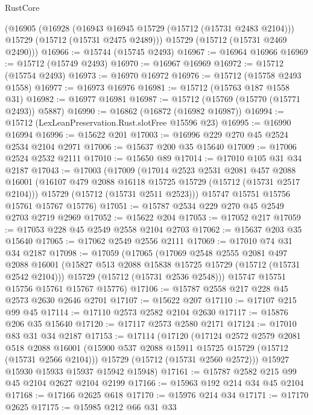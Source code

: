 \begin{lexlean}{RustCore}
\begin{coremodule}
    (@16905
      (@16928
        (@16943 @16945 @15729 (@15712 (@15731 @2483 @2104)))
        @15729
        (@15712 (@15731 @2475 @2489)))
      @15729
      (@15712 (@15731 @2469 @2490)))
@16966 := @15744 (@15745 @2493)
@16967 := @16964 @16966
@16969 := @15712 (@15749 @2493)
@16970 := @16967 @16969
@16972 := @15712 (@15754 @2493)
@16973 := @16970 @16972
@16976 := @15712 (@15758 @2493 @1558)
@16977 := @16973 @16976
@16981 := @15712 (@15763 @187 @1558 @31)
@16982 := @16977 @16981
@16987 := @15712 (@15769 (@15770 (@15771 @2493)) @5887)
@16990 := @16862 (@16872 (@16982 @16987))
@16994 := @15712 (LexLeanPreservation.Rust.slotFree @15596 @23)
@16995 := @16990 @16994
@16996 := @15622 @201
@17003 := @16996 @229 @270 @45 @2524 @2534 @2104 @2971
@17006 := @15637 @200 @35 @15640
@17009 := @17006 @2524 @2532 @2111
@17010 := @15650 @89
@17014 := @17010 @105 @31 @34 @2187
@17043 := @17003
    (@17009
      (@17014
        @2523
        @2531
        @2081
        @457
        @2088
        @16001
        (@16107 @479 @2088 @16118 @15725 @15729 (@15712 (@15731 @2517 @2104)))
        @15729
        (@15712 (@15731 @2511 @2523)))
      @15747
      @15751
      @15756
      @15761
      @15767
      @15776)
@17051 := @15787 @2534 @229 @270 @45 @2549 @2703 @2719 @2969
@17052 := @15622 @204
@17053 := @17052 @217
@17059 := @17053 @228 @45 @2549 @2558 @2104 @2703
@17062 := @15637 @203 @35 @15640
@17065 := @17062 @2549 @2556 @2111
@17069 := @17010 @74 @31 @34 @2187
@17098 := @17059
    (@17065
      (@17069
        @2548
        @2555
        @2081
        @497
        @2088
        @16001
        (@15827 @513 @2088 @15838 @15725 @15729 (@15712 (@15731 @2542 @2104)))
        @15729
        (@15712 (@15731 @2536 @2548)))
      @15747
      @15751
      @15756
      @15761
      @15767
      @15776)
@17106 := @15787 @2558 @217 @228 @45 @2573 @2630 @2646 @2701
@17107 := @15622 @207
@17110 := @17107 @215 @99 @45
@17114 := @17110 @2573 @2582 @2104 @2630
@17117 := @15876 @206 @35 @15640
@17120 := @17117 @2573 @2580 @2171
@17124 := @17010 @83 @31 @34 @2187
@17153 := @17114
    (@17120
      (@17124
        @2572
        @2579
        @2081
        @518
        @2088
        @16001
        (@15900 @537 @2088 @15911 @15725 @15729 (@15712 (@15731 @2566 @2104)))
        @15729
        (@15712 (@15731 @2560 @2572)))
      @15927
      @15930
      @15933
      @15937
      @15942
      @15948)
@17161 := @15787 @2582 @215 @99 @45 @2104 @2627 @2104 @2199
@17166 := @15963 @192 @214 @34 @45 @2104
@17168 := @17166 @2625 @618
@17170 := @15976 @214 @34
@17171 := @17170 @2625
@17175 := @15985 @212 @66 @31 @33

\end{coremodule}
\end{lexlean}
